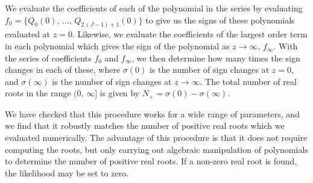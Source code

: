 \documentclass[manuscript, letterpaper]{aastex6}
\begin{document}
We evaluate the coefficients of each of the polynomial in the series by
evaluating $f_0 = \{Q_0(0),\,\ldots,\,Q_{2\,(J-1)+1}(0)\}$ to give us the signs
of these polynomials evaluated at $z=0$.
Likewise, we evaluate the coefficients of the largest order term in each
polynomial which gives the sign of the polynomial as $z \rightarrow \infty$,
$f_\infty$.
With the series of coefficients $f_0$ and $f_\infty$, we then determine how
many times the sign changes in each of these, where $\sigma(0)$ is the number
of sign changes at $z=0$, and $\sigma(\infty)$ is the number of sign changes
at $z \rightarrow \infty$.
The total number of real roots in the range
$(0,\,\infty]$ is given by $N_{+}=\sigma(0)-\sigma(\infty)$.

We have checked that this procedure works for a wide range of parameters, and
we find that it robustly matches the number of positive real roots which we
evaluated numerically.
The advantage of this procedure is that it does not require computing the
roots, but only carrying out algebraic manipulation of polynomials to
determine the number of positive real roots.
If a non-zero real root is found, the likelihood may be set to zero.


\end{document}
